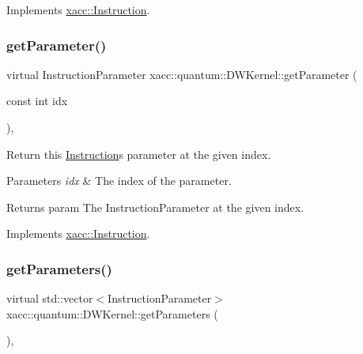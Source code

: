 Implements \hyperlink{a01155_ac7ff23f693e2276edbf3fdac5452792c}{xacc\+::\+Instruction}.

\mbox{\label{a00983_a81711b7db284aba35d6952e4d1d15d41}} 
\subsubsection{\texorpdfstring{get\+Parameter()}{getParameter()}}
{\footnotesize\ttfamily virtual Instruction\+Parameter xacc\+::quantum\+::\+D\+W\+Kernel\+::get\+Parameter (\begin{DoxyParamCaption}\item[{const int}]{idx }\end{DoxyParamCaption})\hspace{0.3cm}{\ttfamily [inline]}, {\ttfamily [virtual]}}

Return this \hyperlink{a01155}{Instruction}\textquotesingle{}s parameter at the given index.


\begin{DoxyParams}{Parameters}
{\em idx} & The index of the parameter. \\
\hline
\end{DoxyParams}
\begin{DoxyReturn}{Returns}
param The Instruction\+Parameter at the given index. 
\end{DoxyReturn}


Implements \hyperlink{a01155_aa0d9de97a4833a042379647f83c33ab6}{xacc\+::\+Instruction}.

\mbox{\label{a00983_a829462cff34e2257da06afd8a2051a8e}} 
\subsubsection{\texorpdfstring{get\+Parameters()}{getParameters()}}
{\footnotesize\ttfamily virtual std\+::vector$<$Instruction\+Parameter$>$ xacc\+::quantum\+::\+D\+W\+Kernel\+::get\+Parameters (\begin{DoxyParamCaption}{ }\end{DoxyParamCaption})\hspace{0.3cm}{\ttfamily [inline]}, {\ttfamily [virtual]}}

